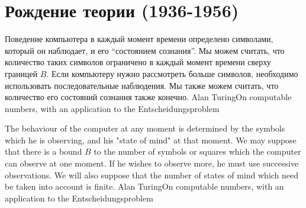 \documentclass[24pt,pdf,hyperref={unicode},aspectratio=169]{beamer}
\begin{document}
\section{Рождение теории (1936-1956)}

\begin{frame}
\end{frame}

\begin{frame}
\end{frame}

 

\begin{frame}
\citate
{
Поведение компьютера в каждый момент времени определено символами, который он наблюдает, и его ``состоянием сознания''. 
Мы можем считать, что количество таких символов ограничено в каждый момент времени сверху границей $B$. Если компьютеру нужно рассмотреть 
больше символов, необходимо использовать последовательные наблюдения. Мы также можем считать, что количество его состояний сознания также конечно.
}{Alan Turing}{On computable numbers, with an application to the Entscheidungsproblem}
\end{frame}

\begin{frame}
\citate
{
The behaviour of the computer at any moment is determined by the symbols which \alert<2->{he} is observing, and \alert<2->{his "state of mind"} at that moment. We may suppose that there is a bound $B$ to the number of symbols or squares which the computer can observe at one moment. If \alert<2->{he wishes} to observe more, he must use successive observations. We will also suppose that the number of \alert<2->{states of mind} which need be taken into account is finite.
}{Alan Turing}{On computable numbers, with an application to the Entscheidungsproblem}
\end{frame}
\end{document}
